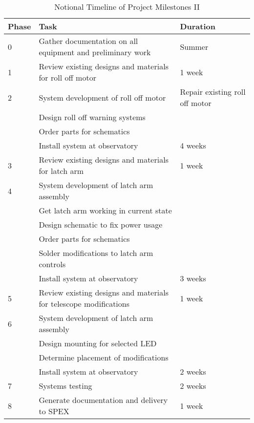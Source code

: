 \documentclass[conference]{IEEEtran} %
\begin{document}
  \begin{table}[hb!]
        \caption{Notional Timeline of Project Milestones II}
        \centering
        \begin{tabularx}{\linewidth}{lXl}
            \toprule %
            Phase & Task & Duration \\
            \midrule %
            0 & Gather documentation on all equipment and preliminary work & Summer \\
            1 & Review existing designs and materials for roll off motor & 1 week \\
            2 & System development of roll off motor
            & Repair existing roll off motor  \\
            & Design roll off warning systems \\
            & Order parts for schematics \\
            & Install system at observatory & 4 weeks \\
            3 & Review existing designs and materials for latch arm & 1 week \\
            4 & System development of latch arm assembly \\
            & Get latch arm working in current state \\
            & Design schematic to fix power usage \\
            & Order parts for schematics \\
            & Solder modifications to latch arm controls \\
            & Install system at observatory & 3 weeks \\
            5 & Review existing designs and materials for telescope modifications & 1 week \\
            6 & System development of latch arm assembly \\
            & Design mounting for selected LED \\
            & Determine placement of modifications \\
            & Install system at observatory & 2 weeks \\
            7 & Systems testing & 2 weeks \\
            8 & Generate documentation and delivery to SPEX & 1 week \\
            \bottomrule
        \end{tabularx}
    \label{tab:timeline2}
    \end{table}
\end{document}
